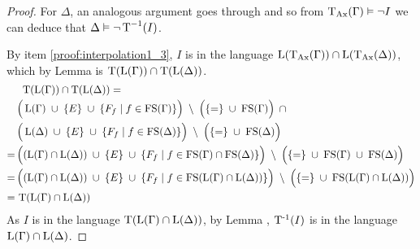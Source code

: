 \begin{proof}
			For $\Delta$, an analogous argument goes through and so from $\operatorname{\operatorname{T}_{Ax}}(\Gamma) \vDash \lnot I$ we can deduce that $\Delta \vDash \lnot \operatorname{T}^{-1}(I)$.

			By item \ref{proof:interpolation1_3}, $I$ is in the language $\operatorname{L}(\operatorname{\operatorname{T}_{Ax}}(\Gamma)) \cap \operatorname{L}(\operatorname{\operatorname{T}_{Ax}}(\Delta))$, which by Lemma  is $\Trans(\Lang(\Gamma)) \cap\nolinebreak \Trans(\Lang(\Delta))$. 
				\newcommand{\somespace}{\;}
				\newcommand{\impconn}[1]{\somespace#1\somespace}
			\begin{align*}
				\noalign{$\Trans(\Lang(\Gamma))\cap\nolinebreak \Trans(\Lang(\Delta)) =$} 
				& \Big(\Lang(\Gamma)\impconn\cup \{E\}\impconn\cup\{F_f\mid f \in \FS(\Gamma)\}\Big) \impconn\setminus\Big(\{=\nolinebreak \} \impconn\cup \FS(\Gamma)\Big)\,\impconn\cap \\
				& \Big(\Lang(\Delta)\impconn\cup \{E\}\impconn\cup\{F_f\mid f \in \FS(\Delta)\}\Big) \impconn\setminus\Big(\{=\nolinebreak \} \impconn\cup \FS(\Delta)\Big)\\
				=\,& \Big((\Lang(\Gamma) \cap \Lang(\Delta)) \impconn\cup \{E\} \impconn\cup\{F_f\mid f \in \FS(\Gamma)\cap\FS(\Delta)\}\Big)  \impconn\setminus\Big(\{=\} \impconn\cup \FS(\Gamma) \impconn\cup \FS(\Delta)\Big) \\
				=\,& \Big((\Lang(\Gamma) \cap \Lang(\Delta)) \impconn\cup \{E\} \impconn\cup \{F_f\mid f\in \FS( \Lang(\Gamma) \cap \Lang(\Delta))\} \Big) \impconn\setminus \Big( \{=\} \impconn\cup \FS(\Lang(\Gamma) \cap \Lang(\Delta)) \Big)  \\ 
				=\,& \Trans(\Lang(\Gamma) \cap \Lang(\Delta))
			\end{align*}
			As $I$ is in the language $\operatorname{T}(\operatorname{L}(\Gamma) \cap \operatorname{L}(\Delta))$, by Lemma , $\operatorname{T^{-1}}(I)$ is in the language $\operatorname{L}(\Gamma) \cap \operatorname{L}(\Delta)$.
		\end{proof}


